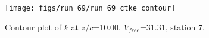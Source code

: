 \begin{figure}[H]
\centering
\texttt{[image: figs/run\_69/run\_69\_ctke\_contour]}
\caption{Contour plot of $k$ at $z/c$=10.00, $V_{free}$=31.31, station 7.}
\label{fig:run_69_ctke_contour}
\end{figure}


